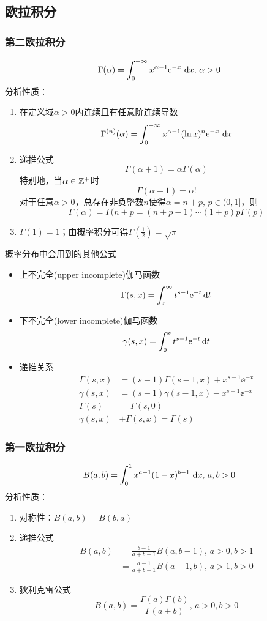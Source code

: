 \subsection{欧拉积分}
\subsubsection{第二欧拉积分}
\[\Gamma(\alpha)=\displaystyle\int_{0}^{+\infty}{x^{\alpha-1}\mathrm{e}^{-x}}\,\,\mathrm{d} x,\,\alpha>0\]
分析性质：
\begin{enumerate}
	\item 在定义域$\alpha>0$内连续且有任意阶连续导数
	\[\Gamma^{(n)}(\alpha)=\displaystyle\int_{0}^{+\infty}{x^{\alpha-1}(\ln x)^n\mathrm{e}^{-x}}\,\,\mathrm{d} x\]
	\item 递推公式
	\[\Gamma(\alpha+1)=\alpha\Gamma(\alpha)\]
	特别地，当$\alpha\in\mathbb{Z}^+$时
	\[\Gamma(\alpha+1)=\alpha!\]
	对于任意$\alpha>0$，总存在非负整数$n$使得$\alpha=n+p,\,p\in(0,1]$，则
	\[\Gamma(\alpha)=\Gamma(n+p=(n+p-1)\cdots(1+p)p\Gamma(p)\]
	\item $\Gamma(1)=1$；由概率积分可得$\Gamma(\frac{1}{2})=\sqrt{\pi}$
\end{enumerate}
概率分布中会用到的其他公式
\begin{itemize}
\item 上不完全(upper incomplete)伽马函数
\[ \Gamma(s,x) = \int_x^{\infty} t^{s-1}\mathrm{e}^{-t}\,\mathrm{d} t\]
\item 下不完全(lower incomplete)伽马函数
\[ \gamma(s,x) = \int_{0}^{x}t^{s-1}\mathrm{e}^{-t}\,\mathrm{d} t\]
\item 递推关系
\[\begin{aligned}
\Gamma(s,x)&=(s-1)\Gamma(s-1,x) + x^{s-1} \ee^{-x}\\
\gamma(s,x)&=(s-1)\gamma(s-1,x) - x^{s-1} \ee^{-x}\\
\Gamma(s) &= \Gamma(s,0)\\
\gamma (s,x)&+\Gamma (s,x)=\Gamma (s)
\end{aligned}\]
\end{itemize}

\subsubsection{第一欧拉积分}
\[B(a,b)=\displaystyle\int_{0}^{1}{x^{a-1}(1-x)^{b-1}}\,\,\mathrm{d} x,\,a,b>0\]
分析性质：
\begin{enumerate}
	\item 对称性：$B(a,b)=B(b,a)$
	\item 递推公式
	\[\begin{aligned}
	B(a,b)&=\frac{b-1}{a+b-1}B(a,b-1),\,a>0,b>1\\
	&=\frac{a-1}{a+b-1}B(a-1,b),\,a>1,b>0
	\end{aligned}\]
	\item 狄利克雷公式
	\[B(a,b)=\frac{\Gamma(a)\Gamma(b)}{\Gamma(a+b)},\,a>0,b>0\]
\end{enumerate}